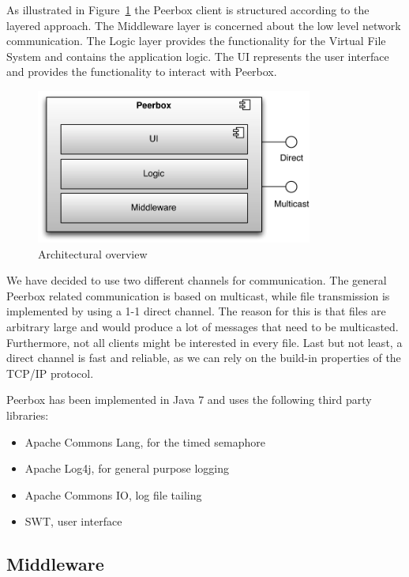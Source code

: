 
As illustrated in Figure~\ref{fig:figures_archOverview} the Peerbox client is structured according to the layered approach. The Middleware layer is concerned about the low level network communication. The Logic layer provides the functionality for the Virtual File System and contains the application logic. The UI represents the user interface and provides the functionality to interact with Peerbox.

\begin{figure}[htbp]
    \centering
        \includegraphics[height=2in]{figures/archOverview.pdf}
    \caption{Architectural overview}
    \label{fig:figures_archOverview}
\end{figure}

We have decided to use two different channels for communication. The general Peerbox related communication is based on multicast, while file transmission is implemented by using a 1-1 direct channel. 
The reason for this is that files are arbitrary large and would produce a lot of messages that need to be multicasted. Furthermore, not all clients might be interested in every file. Last but not least, a direct channel is fast and reliable, as we can rely on the build-in properties of the TCP/IP protocol.

Peerbox has been implemented in Java 7 and uses the following third party libraries: 
\begin{itemize}
    \item Apache Commons Lang, for the timed semaphore
    \item Apache Log4j, for general purpose logging
    \item Apache Commons IO, log file tailing
    \item SWT, user interface
\end{itemize}

\subsection{Middleware}

